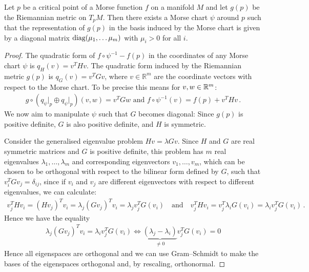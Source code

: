 \begin{theorem}\label{thm:morse-simultaneousDiagonalisationOfQuadraticForms}
	Let $p$ be a critical point of a Morse function $f$ on a manifold $M$ and let $g(p)$ be the Riemannian metric on $T_pM$. Then there exists a Morse chart $\psi$ around $p$ such that the representation of $g(p)$ in the basis induced by the Morse chart is given by a diagonal matrix $\mathrm{diag}(\mu_1,\dots \mu_m)$ with $\mu_i>0$ for all $i$.
\end{theorem}
\begin{proof}
	The quadratic form of $f \circ \psi^{-1} - f(p)$ in the coordinates of any Morse chart $\psi$ is $q_H(v) = v^T H v$. The quadratic form induced by the Riemannian metric $g(p)$ is $q_G(v) = v^T G v$, where $v \in \mathbb{R}^m$ are the coordinate vectors with respect to the Morse chart. 
	To be precise this means for $v,w\in \mathbb{R}^m$:
	\begin{align*}
		g\circ ( q_{\psi}\big|_p\oplus q_{\psi}\big|_p ) (v,w)=v^TG w \text{ and } f\circ \psi^{-1} (v)=f(p)+v^T H v \, .
	\end{align*} We now aim to manipulate $\psi$ such that $G$ becomes diagonal:
	Since $g(p)$ is positive definite, $G$ is also positive definite, and $H$ is symmetric.
	
	Consider the generalised eigenvalue problem $Hv = \lambda G v$. Since $H$ and $G$ are real symmetric matrices and $G$ is positive definite, this problem has $m$ real eigenvalues $\lambda_1, \dots, \lambda_m$ and corresponding eigenvectors $v_1, \dots, v_m$, which can be chosen to be orthogonal with respect to the bilinear form defined by $G$, such that $v_i^T G v_j = \delta_{ij}$, since if $v_i$ and $v_j$ are different eigenvectors with respect to different eigenvalues, we can calculate:
	\begin{align*}
		v_j^THv_i=(Hv_j)^Tv_i=\lambda _j(Gv_j)^Tv_i=\lambda _j v_j^T G(v_i)  \quad \text{and}\quad 	v_j^THv_i= v_j^T \lambda_i G(v_i)=\lambda_i v_j^TG(v_i) \, .
	\end{align*} Hence we have the equality
	\begin{align*}
		\lambda _j(Gv_j)^Tv_i=\lambda_i v_j^TG(v_i) \Leftrightarrow \underbrace{(\lambda_j-\lambda_i)}_{\neq 0}v_j^T G(v_i)=0
	\end{align*} Hence all eigenspaces are orthogonal and we can use Gram--Schmidt to make the bases of the eigenspaces orthogonal and, by rescaling, orthonormal.
	

\end{proof}

